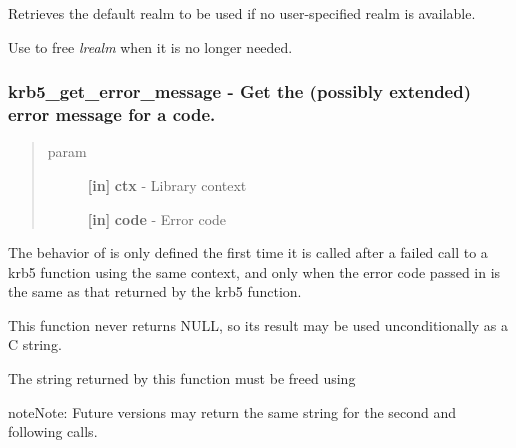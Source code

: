 \documentclass[letterpaper,10pt,english]{sphinxmanual}
\begin{document}
Retrieves the default realm to be used if no user-specified realm is available.

Use {\hyperref[appdev/refs/api/krb5_free_default_realm:c.krb5_free_default_realm]{}} to free \emph{lrealm} when it is no longer needed.


\subsubsection{krb5\_get\_error\_message -  Get the (possibly extended) error message for a code.}
\label{appdev/refs/api/krb5_get_error_message::doc}\label{appdev/refs/api/krb5_get_error_message:krb5-get-error-message-get-the-possibly-extended-error-message-for-a-code}

\begin{fulllineitems}
\label{appdev/refs/api/krb5_get_error_message:c.krb5_get_error_message}
\end{fulllineitems}

\begin{quote}\begin{description}
\item[{param}] \leavevmode
\textbf{{[}in{]}} \textbf{ctx} - Library context

\textbf{{[}in{]}} \textbf{code} - Error code

\end{description}\end{quote}

The behavior of {\hyperref[appdev/refs/api/krb5_get_error_message:c.krb5_get_error_message]{}} is only defined the first time it is called after a failed call to a krb5 function using the same context, and only when the error code passed in is the same as that returned by the krb5 function.

This function never returns NULL, so its result may be used unconditionally as a C string.

The string returned by this function must be freed using {\hyperref[appdev/refs/api/krb5_free_error_message:c.krb5_free_error_message]{}}

\begin{notice}{note}{Note:}
Future versions may return the same string for the second and following calls.
\end{notice}
\end{document}
